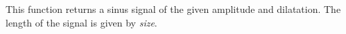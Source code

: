 This function returns a sinus signal
of the given amplitude and dilatation. 
The length of the signal is given by {\em size}.





